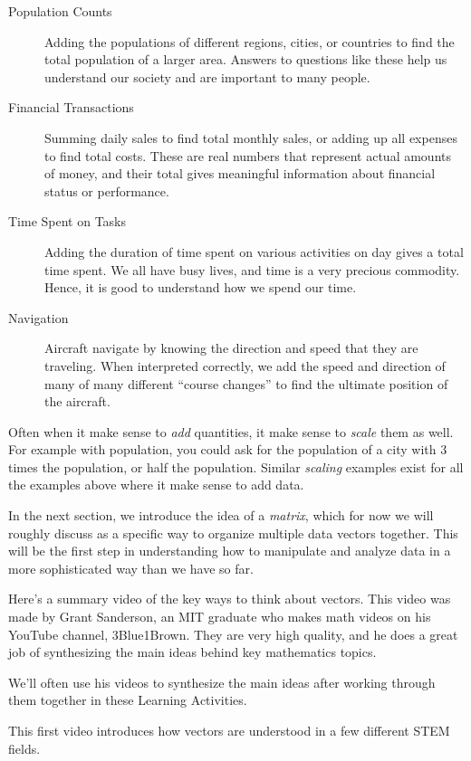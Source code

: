 \documentclass{ximera}
\begin{document}
\begin{exploration}
\begin{example}
\begin{description}
\item[Population Counts] Adding the populations of different regions,
  cities, or countries to find the total population of a larger
  area. Answers to questions like these help us understand our
  society and are important to many people.
\item[Financial Transactions] Summing daily sales to find total
  monthly sales, or adding up all expenses to find total costs. These
  are real numbers that represent actual amounts of money, and their
  total gives meaningful information about financial status or
  performance.
\item[Time Spent on Tasks] Adding the duration of time spent on
  various activities on day gives a total time spent. We all have busy
  lives, and time is a very precious commodity. Hence, it is good to
  understand how we spend our time.
\item[Navigation] Aircraft navigate by knowing the direction and speed
  that they are traveling. When interpreted correctly, we add the
  speed and direction of many of many different ``course changes'' to
  find the ultimate position of the aircraft.
\end{description}

\end{example}

Often when it make sense to \textit{add} quantities, it make sense to
\textit{scale} them as well. For example with population, you could
ask for the population of a city with $3$ times the population, or
half the population. Similar \textit{scaling} examples exist for all
the examples above where it make sense to add data.

\end{exploration}

In the next section, we introduce the idea of a \emph{matrix}, which for now we will roughly discuss as a specific way to organize multiple data vectors together. This will be the first step in understanding how to manipulate and analyze data in a more sophisticated way than we have so far.

Here's a summary video of the key ways to think about vectors. This video was made by Grant Sanderson, an MIT graduate who makes math videos on his YouTube channel, 3Blue1Brown. They are very high quality, and he does a great job of synthesizing the main ideas behind key mathematics topics. 

We'll often use his videos to synthesize the main ideas after working through them together in these Learning Activities.

This first video introduces how vectors are understood in a few different STEM fields. 

\end{document}
